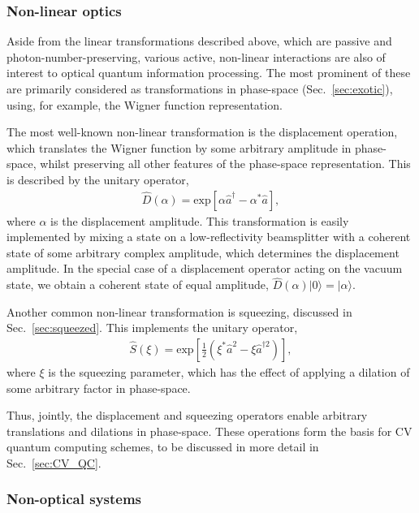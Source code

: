 \documentclass[aps,rmp,twocolumn,amsmath,amssymb,nofootinbib,superscriptaddress,longbibliography,floatfix,table-of-contents,eqsecnum]{revtex4-1}
\newcommand{\ket}[1]{|#1\rangle}
\begin{document}
%
%

\subsubsection{Non-linear optics} \label{sec:non_lin_opt} 

Aside from the linear transformations described above, which are passive and photon-number-preserving, various active, non-linear interactions are also of interest to optical quantum information processing. The most prominent of these are primarily considered as transformations in phase-space (Sec.~\ref{sec:exotic}), using, for example, the Wigner function representation.

The most well-known non-linear transformation is the displacement operation, which translates the Wigner function by some arbitrary amplitude in phase-space, whilst preserving all other features of the phase-space representation. This is described by the unitary operator,
\begin{align}
\hat{D}(\alpha) = \text{exp}\left[\alpha\hat{a}^\dag - \alpha^*\hat{a}\right],
\end{align}
where $\alpha$ is the displacement amplitude. This transformation is easily implemented by mixing a state on a low-reflectivity beamsplitter with a coherent state of some arbitrary complex amplitude, which determines the displacement amplitude. In the special case of a displacement operator acting on the vacuum state, we obtain a coherent state of equal amplitude, \mbox{$\hat{D}(\alpha)\ket{0}=\ket\alpha$}.

Another common non-linear transformation is squeezing, discussed in Sec.~\ref{sec:squeezed}. This implements the unitary operator,
\begin{align}
\hat{S}(\xi) = \text{exp}\left[ \frac{1}{2}(\xi^*\hat{a}^2 - \xi{\hat{a}^{\dag 2}})\right],
\end{align}
where $\xi$ is the squeezing parameter, which has the effect of applying a dilation of some arbitrary factor in phase-space.

Thus, jointly, the displacement and squeezing operators enable arbitrary translations and dilations in phase-space. These operations form the basis for CV quantum computing schemes, to be discussed in more detail in Sec.~\ref{sec:CV_QC}.

%
%

\subsubsection{Non-optical systems}
\end{document}
